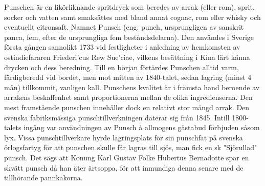 \vspace{10pt}
Punschen är en likörliknande spritdryck som beredes av arrak (eller rom), sprit, socker och vatten samt smaksättes med bland annat cognac, rom eller whisky och eventuellt citronsaft. Namnet Punsch (eng. punch, ursprungligen av sanskrit panca, fem, efter de ursprungliga fem beståndsdelarna).
Den användes i Sverige första gången sannolikt 1733 vid festligheter i anledning av hemkomsten av ostindiefararen Friederi'cus Rew Sue'ciae, vilkens besättning i Kina lärt känna drycken och dess beredning. Till en början förtärdes Punschen alltid varm, färdigberedd vid bordet, men mot mitten av 1840-talet, sedan lagring (minst 4 mån) tillkommit, vanligen kall.
Punschens kvalitet är i främsta hand beroende av arrakens beskaffenhet samt proportionerna mellan de olika ingredienserna. Den mest framstående punschen innehåller dock en relativt stor mängd arrak.
Den svenska fabriksmässiga punschtillverkningen daterar sig från 1845. Intill 1800-talets ingång var användningen av Punsch å allmogens gästabud förbjuden såsom lyx.
Vissa punschtillverkare hyrde lagringsplats för sin punschfat på svenska örlogsfartyg för att punschen skulle får lagras till sjös, man fick en sk "Sjörullad" punsch.
Det sägs att Konung Karl Gustav Folke Hubertus Bernadotte spar en skvätt punsch då han äter ärtsoppa, för att inmundiga denna senare med de tillhörande pannkakorna.
